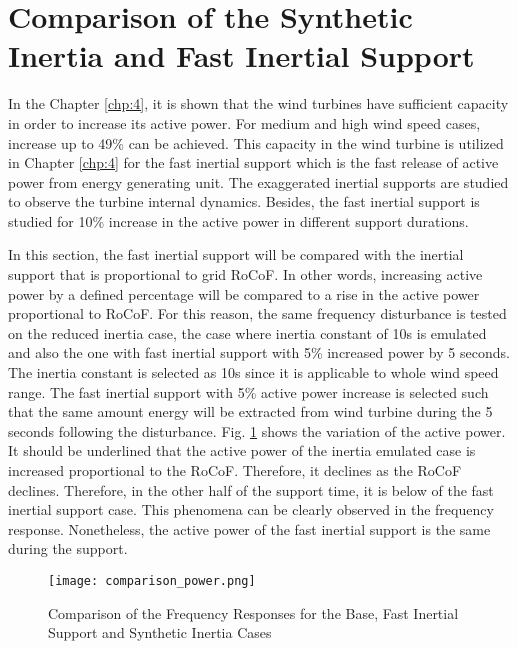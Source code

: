 \section{Comparison of the Synthetic Inertia and Fast Inertial Support}
In the Chapter \ref{chp:4}, it is shown that the wind turbines have sufficient capacity in order to increase its active power. For medium and high wind speed cases, increase up to 49\% can be achieved. This capacity in the wind turbine is utilized in Chapter \ref{chp:4} for the fast inertial support which is the fast release of active power from energy generating unit. The exaggerated inertial supports are studied to observe the turbine internal dynamics. Besides, the fast inertial support is studied for 10\% increase in the active power in different support durations.\par
In this section, the fast inertial support will be compared with the inertial support that is proportional to grid RoCoF. In other words, increasing active power by a defined percentage will be compared to a rise in the active power proportional to RoCoF. For this reason, the same frequency disturbance is tested on the reduced inertia case, the case where inertia constant of 10s is emulated and also the one with fast inertial support with 5\% increased power by 5 seconds. The inertia constant is selected as 10s since it is applicable to whole wind speed range. The fast inertial support with 5\% active power increase is selected such that the same amount energy will be extracted from wind turbine during the 5 seconds following the disturbance. Fig. \ref{Comp_power} shows the variation of the active power. It should be underlined that the active power of the inertia emulated case is increased proportional to the RoCoF. Therefore, it declines as the RoCoF declines. Therefore, in the other half of the support time, it is below of the fast inertial support case. This phenomena can be clearly observed in the frequency response. Nonetheless, the active power of the fast inertial support is the same during the support.\par
\begin{figure}[h]
	\centering
	\texttt{[image: comparison\_power.png]}
	\caption{Comparison of the Frequency Responses for the Base, Fast Inertial Support and Synthetic Inertia Cases}
	\label{Comp_power}
\end{figure}
